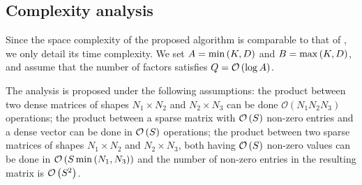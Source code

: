 \subsection{Complexity analysis}

Since the space complexity of the proposed \qkmeans algorithm is comparable to that of \kmeans, we only detail its time complexity. We set $A=\min\left (K, D\right )$ and $B=\max\left (K, D\right )$, and assume that the number of factors satisfies $Q=\mathcal{O}\left (\log A\right )$.

The analysis is proposed under the following assumptions: the product between two dense matrices of shapes ${N_1\times N_2}$ and ${N_2\times N_3}$ can be done $\mathcal{O}\left (N_1 N_2 N_3 \right )$ operations; 
the product between a sparse matrix with $\mathcal{O}\left (S\right )$ non-zero entries and a dense vector can be done in $\mathcal{O}\left (S\right )$ operations; 
the product between two sparse matrices of shapes ${N_1\times N_2}$ and ${N_2\times N_3}$, both having $\mathcal{O}\left (S\right )$ non-zero values can be done in $\mathcal{O}\left (S \min\left (N_1, N_3\right )\right )$ and the number of non-zero entries in the resulting matrix is $\mathcal{O}\left (S^2\right )$.





%

